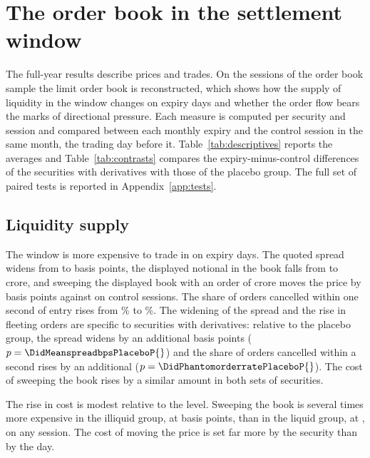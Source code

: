 \section{The order book in the settlement window}\label{sec:book}

The full-year results describe prices and trades. On the \DesignSessions{} sessions of the
order book sample the limit order book is reconstructed, which shows how the supply of
liquidity in the window changes on expiry days and whether the order flow bears the marks of
directional pressure. Each measure is computed per security and session and compared between
each monthly expiry and the control session in the same month, the trading day before it.
Table~\ref{tab:descriptives} reports the averages and Table~\ref{tab:contrasts} compares the
expiry-minus-control differences of the securities with derivatives with those of the placebo
group. The full set of paired tests is reported in Appendix~\ref{app:tests}.



\subsection{Liquidity supply}

The window is more expensive to trade in on expiry days. The quoted spread widens from
\SpreadMeanBpsControl{} to \SpreadMeanBpsExpiry{} basis points, the displayed notional in the
book falls from \BookVisibleCrControl{} to \BookVisibleCrExpiry{} crore, and sweeping the
displayed book with an order of \ProbeSizeCr{} crore moves the price by
\MoveBpsSmallExpiry{} basis points against \MoveBpsSmallControl{} on control sessions. The share
of orders cancelled within one second of entry rises from \LifePhantomRateControl{}\% to
\LifePhantomRateExpiry{}\%. The widening of the spread and the rise in fleeting orders are
specific to securities with derivatives: relative to the placebo group, the spread widens by an
additional \DidMeanspreadbpsPlacebo{} basis points ($p = \DidMeanspreadbpsPlaceboP{}$) and the
share of orders cancelled within a second rises by an additional
\DidPhantomorderratePlacebo{} ($p = \DidPhantomorderratePlaceboP{}$). The
cost of sweeping the book rises by a similar amount in both sets of securities.

The rise in cost is modest relative to the level. Sweeping the book is several times more
expensive in the illiquid group, at \MoveBpsSmallIlliquid{} basis points, than in the liquid
group, at \MoveBpsSmallLiquid{}, on any session. The cost of moving the price is set far more by
the security than by the day.

